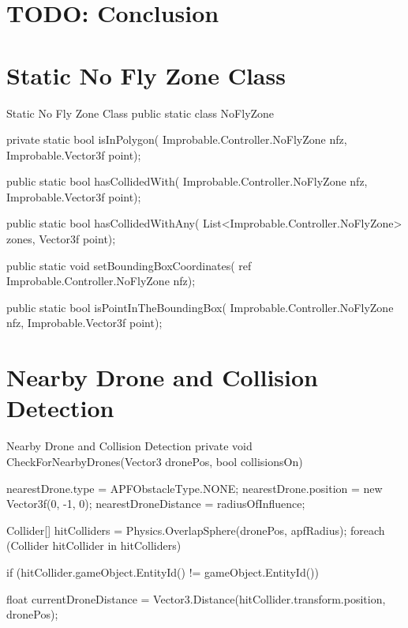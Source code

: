 \documentclass[a4paper,12pt,titlepage]{article}
\begin{document}
\newpage
\section{TODO: Conclusion}



\newpage
{}

\printbibliography

\begin{appendices}

\section{Static No Fly Zone Class}
\begin{sexylisting}[colback=white]{Static No Fly Zone Class}
public static class NoFlyZone
{
    private static bool isInPolygon(
      Improbable.Controller.NoFlyZone nfz,
      Improbable.Vector3f point);

    public static bool hasCollidedWith(
      Improbable.Controller.NoFlyZone nfz,
      Improbable.Vector3f point);

    public static bool hasCollidedWithAny(
      List<Improbable.Controller.NoFlyZone> zones,
      Vector3f point);

    public static void setBoundingBoxCoordinates(
      ref Improbable.Controller.NoFlyZone nfz);

    public static bool isPointInTheBoundingBox(
      Improbable.Controller.NoFlyZone nfz,
      Improbable.Vector3f point);
}
\end{sexylisting}

\section{Nearby Drone and Collision Detection}
\begin{sexylisting}[colback=white]{Nearby Drone and Collision Detection}
private void CheckForNearbyDrones(Vector3 dronePos, bool collisionsOn)
{
  nearestDrone.type = APFObstacleType.NONE;
  nearestDrone.position = new Vector3f(0, -1, 0);
  nearestDroneDistance = radiusOfInfluence;

  Collider[] hitColliders = Physics.OverlapSphere(dronePos, apfRadius);
  foreach (Collider hitCollider in hitColliders)
  {
    if (hitCollider.gameObject.EntityId() != gameObject.EntityId())
    {
      float currentDroneDistance
        = Vector3.Distance(hitCollider.transform.position, dronePos);

}}}
\end{sexylisting}
\end{appendices}
\end{document}
